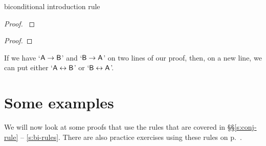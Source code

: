 \begin{factboxy}{biconditional introduction rule}
\begin{proof}\label{eiff-I}
	 
\end{proof}
\begin{proof}
	 
\end{proof}

\small{If we have `$\mathsf{A}\rightarrow\mathsf{B}$' and `$\mathsf{B}\rightarrow\mathsf{A}$' on two lines of our proof, then, on a new line, we can put either `$\mathsf{A}\leftrightarrow\mathsf{B}$' or `$\mathsf{B}\leftrightarrow\mathsf{A}$'.}

\end{factboxy}





\section{Some examples}

We will now look at some proofs that use the rules that are covered in \S\S \ref{s:conj-rule} -- \ref{s:bi-rules}. There are also practice exercises using these rules on p.~\pageref{practice-proofs-1}. 

